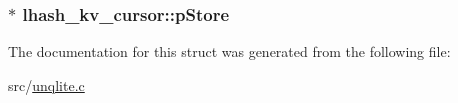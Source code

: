 \hypertarget{structlhash__kv__cursor_a75054f250da7990f95bbd5b74acb94be}{
\subsubsection[{p\-Store}]{$\ast$ lhash\-\_\-kv\-\_\-cursor\-::p\-Store}}\label{df/d9a/structlhash__kv__cursor_a75054f250da7990f95bbd5b74acb94be}


The documentation for this struct was generated from the following file\-:\begin{DoxyCompactItemize}
\item 
src/\hyperlink{unqlite_8c}{unqlite.\-c}\end{DoxyCompactItemize}
